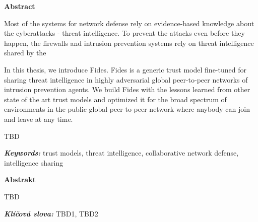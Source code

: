 \newenvironment{abstractpage}
  {\cleardoublepage\thispagestyle{empty}}
  {\vfill\cleardoublepage}
\newenvironment{abstract}[1]
  {\bigskip
   \begin{center}\bfseries#1\end{center}\small\leftskip=0.5cm\rightskip=0.5cm}
  {\par\bigskip}

\providecommand{\keywords}[2]{\footnotesize\textbf{\textit{#1:}} #2}

\begin{abstractpage}
\begin{abstract}{Abstract}

Most of the systems for network defense rely on evidence-based knowledge about the cyberattacks - threat intelligence. To prevent the attacks even before they happen, the firewalls and intrusion prevention systems rely on threat intelligence shared by the 

In this thesis, we introduce Fides. Fides is a generic trust model fine-tuned for sharing threat intelligence in highly adversarial global peer-to-peer networks of intrusion prevention agents.
We build Fides with the lessons learned from other state of the art trust models and optimized it for the broad spectrum of environments in the public global peer-to-peer network where anybody can join and leave at any time.



%  
TBD 
\end{abstract}

\keywords{Keywords}{trust models, threat intelligence, collaborative network defense, intelligence sharing}

\vspace*{\fill}

\begin{abstract}{Abstrakt}
    TBD 
    
\end{abstract}
\keywords{Klíčová slova}{TBD1, TBD2} 

\end{abstractpage}
\thispagestyle{empty}

\cleardoublepage